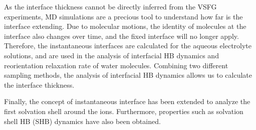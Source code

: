 As the interface thickness cannot be directly inferred from the VSFG experiments,
MD simulations are a precious tool to understand how far is the interface extending.
Due to molecular motions, the identity of molecules at the interface also changes over time\cite{Willard2010}, 
and the fixed interface will no longer apply. 
Therefore, the instantaneous interfaces are calculated for the aqueous electrolyte solutions, and are used in the analysis of interfacial HB dynamics
and reorientation relaxation rate of water molecules.
Combining two different sampling methods, the analysis of interfacial HB dynamics allows us to calculate the interface thickness.

Finally, the concept of instantaneous interface 
has been extended to analyze the first solvation shell around the ions.
Furthermore, properties such as solvation shell HB (SHB) dynamics have also been obtained.


